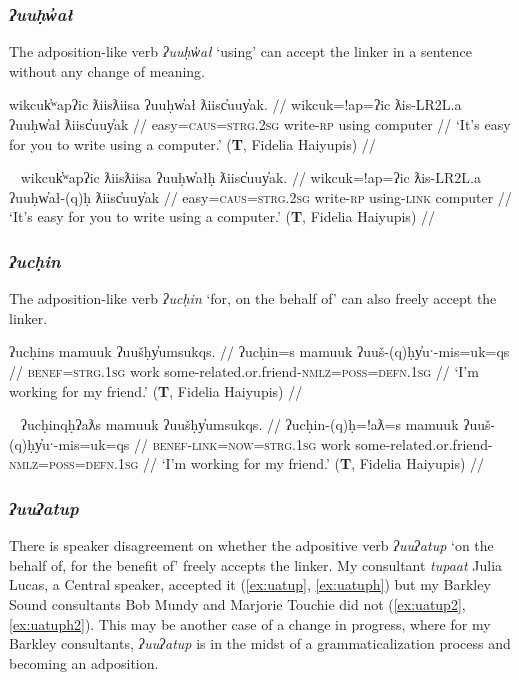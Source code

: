 \subsubsection{\textit{ʔuuḥw̓ał}} \label{ch:link:uuhwal} The adposition-like verb \textit{ʔuuḥw̓ał} `using' can accept the linker in a sentence without any change of meaning.

\ex \label{ex:uuhwal}
\begingl
\glpreamble wikcuk̓ʷapʔic ƛiisƛiisa ʔuuḥw̓ał ƛiisc̓uuy̓ak. //
\gla wikcuk=!ap=ʔic ƛis-LR2L.a ʔuuḥw̓ał ƛiisc̓uuy̓ak //
\glb easy=\textsc{caus}=\textsc{strg.2sg} write-\textsc{rp} using computer //
\glft `It's easy for you to write using a computer.' (\textbf{T}, Fidelia Haiyupis) //
\endgl
\xe

\ex~ \label{ex:uuhwalh}
\begingl
\glpreamble wikcuk̓ʷapʔic ƛiisƛiisa ʔuuḥw̓ałḥ ƛiisc̓uuy̓ak. //
\gla wikcuk=!ap=ʔic ƛis-LR2L.a ʔuuḥw̓ał-(q)ḥ ƛiisc̓uuy̓ak //
\glb easy=\textsc{caus}=\textsc{strg.2sg} write-\textsc{rp} using-\textsc{link} computer //
\glft `It's easy for you to write using a computer.' (\textbf{T}, Fidelia Haiyupis) //
\endgl
\xe

\subsubsection{\textit{ʔucḥin}} \label{ch:link:uuchin} The adposition-like verb \textit{ʔucḥin} `for, on the behalf of' can also freely accept the linker. %

\ex \label{ex:uuchin}
\begingl
\glpreamble ʔucḥins mamuuk ʔuušḥy̓umsukqs. //
\gla ʔucḥin=s mamuuk ʔuuš-(q)ḥy̓uˑ-mis=uk=qs //
\glb \textsc{benef}=\textsc{strg.1sg} work some-related.or.friend-\textsc{nmlz}=\textsc{poss}=\textsc{defn.1sg} //
\glft `I'm working for my friend.' (\textbf{T}, Fidelia Haiyupis) //
\endgl
\xe

\ex~ \label{ex:uuchinqh}
\begingl
\glpreamble ʔucḥinqḥʔaƛs mamuuk ʔuušḥy̓umsukqs. //
\gla ʔucḥin-(q)ḥ=!aƛ=s mamuuk ʔuuš-(q)ḥy̓uˑ-mis=uk=qs //
\glb \textsc{benef}-\textsc{link}=\textsc{now}=\textsc{strg.1sg} work some-related.or.friend-\textsc{nmlz}=\textsc{poss}=\textsc{defn.1sg} //
\glft `I'm working for my friend.' (\textbf{T}, Fidelia Haiyupis) //
\endgl
\xe

\subsubsection{\textit{ʔuuʔatup}} \label{ch:link:uatup} There is speaker disagreement on whether the adpositive verb \textit{ʔuuʔatup} `on the behalf of, for the benefit of' freely accepts the linker. My consultant \textit{tupaat} Julia Lucas, a Central speaker, accepted it (\ref{ex:uatup}, \ref{ex:uatuph}) but my Barkley Sound consultants Bob Mundy and Marjorie Touchie did not (\ref{ex:uatup2}, \ref{ex:uatuph2}). This may be another case of a change in progress, where for my Barkley consultants, \textit{ʔuuʔatup} is in the midst of a grammaticalization process and becoming an adposition.


